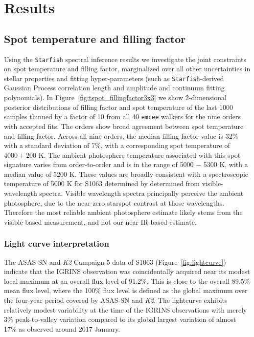 \documentclass[trackchanges]{aastex631}
\begin{document}
\section{Results}
\label{sec:results}

\subsection{Spot temperature and filling factor}
\label{sec:starfishresults}
Using the \texttt{Starfish} spectral inference results we investigate the joint constraints on spot temperature and filling factor, marginalized over all other uncertainties in stellar properties and fitting hyper-parameters (such as \texttt{Starfish}-derived Gaussian Process correlation length and amplitude and continuum fitting polynomials). In Figure~\ref{fig:tspot_fillingfactor3x3} we show 2-dimensional posterior distributions of filling factor and spot temperature of the last 1000 samples thinned by a factor of 10 from all 40 \texttt{emcee} walkers for the nine orders with accepted fits. The orders show broad agreement between spot temperature and filling factor. Across all nine orders, the median filling factor value is 32\% with a standard deviation of 7\%, with a corresponding spot temperature of $4000 \pm 200$ K. The ambient photosphere temperature associated with this spot signature varies from order-to-order and is in the range of 5000 $-$ 5300 K, with a median value of 5200 K.  These values are broadly consistent with a spectroscopic temperature of 5000 K for S1063 determined by \citet{mathieu03} determined from visible-wavelength spectra.  Visible wavelength spectra principally perceive the ambient photosphere, due to the near-zero starspot contrast at those wavelengths.  Therefore the most reliable ambient photosphere estimate likely stems from the visible-based measurement, and not our near-IR-based estimate.

\subsubsection{Light curve interpretation}
The ASAS-SN and \textit{K2} Campaign 5 data of S1063 (Figure~\ref{fig:lightcurve}) indicate that the IGRINS observation was coincidentally acquired near its modest local maximum at an overall flux level of 91.2\%. This is close to the overall 89.5\% mean flux level, where the 100\% flux level is defined as the global maximum over the four-year period covered by ASAS-SN and \textit{K2}. The lightcurve exhibits relatively modest variability at the time of the IGRINS observations with merely 3\% peak-to-valley variation compared to its global largest variation of almost 17\% as observed around 2017 January.
\end{document}
